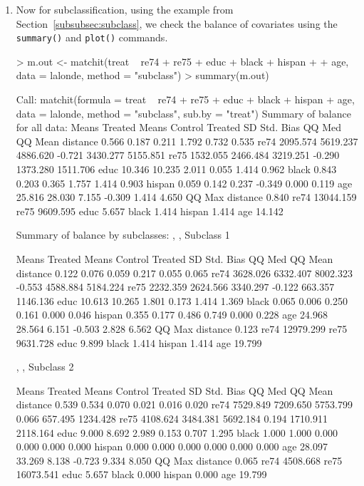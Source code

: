 \documentclass[oneside,letterpaper,titlepage]{article}
\begin{document}
\begin{enumerate}
\item Now for subclassification, using the example from
  Section~\ref{subsubsec:subclass}, we check the balance of covariates
  using the \texttt{summary()} and \texttt{plot()} commands.
\begin{Schunk}
\begin{Sinput}
> m.out <- matchit(treat ~ re74 + re75 + educ + black + hispan + 
+     age, data = lalonde, method = "subclass")
> summary(m.out)
\end{Sinput}
\begin{Soutput}
Call:
matchit(formula = treat ~ re74 + re75 + educ + black + hispan + 
    age, data = lalonde, method = "subclass", sub.by = "treat")
Summary of balance for all data:
         Means Treated Means Control Treated SD Std. Bias   QQ Med  QQ Mean
distance         0.566         0.187      0.211     1.792    0.732    0.535
re74          2095.574      5619.237   4886.620    -0.721 3430.277 5155.851
re75          1532.055      2466.484   3219.251    -0.290 1373.280 1511.706
educ            10.346        10.235      2.011     0.055    1.414    0.962
black            0.843         0.203      0.365     1.757    1.414    0.903
hispan           0.059         0.142      0.237    -0.349    0.000    0.119
age             25.816        28.030      7.155    -0.309    1.414    4.650
            QQ Max
distance     0.840
re74     13044.159
re75      9609.595
educ         5.657
black        1.414
hispan       1.414
age         14.142


Summary of balance by subclasses:
, , Subclass 1

         Means Treated Means Control Treated SD Std. Bias    QQ Med   QQ Mean
distance         0.122         0.076      0.059     0.217     0.055     0.065
re74          3628.026      6332.407   8002.323    -0.553  4588.884  5184.224
re75          2232.359      2624.566   3340.297    -0.122   663.357  1146.136
educ            10.613        10.265      1.801     0.173     1.414     1.369
black            0.065         0.006      0.250     0.161     0.000     0.046
hispan           0.355         0.177      0.486     0.749     0.000     0.228
age             24.968        28.564      6.151    -0.503     2.828     6.562
            QQ Max
distance     0.123
re74     12979.299
re75      9631.728
educ         9.899
black        1.414
hispan       1.414
age         19.799

, , Subclass 2

         Means Treated Means Control Treated SD Std. Bias    QQ Med   QQ Mean
distance         0.539         0.534      0.070     0.021     0.016     0.020
re74          7529.849      7209.650   5753.799     0.066   657.495  1234.428
re75          4108.624      3484.381   5692.184     0.194  1710.911  2118.164
educ             9.000         8.692      2.989     0.153     0.707     1.295
black            1.000         1.000      0.000     0.000     0.000     0.000
hispan           0.000         0.000      0.000     0.000     0.000     0.000
age             28.097        33.269      8.138    -0.723     9.334     8.050
            QQ Max
distance     0.065
re74      4508.668
re75     16073.541
educ         5.657
black        0.000
hispan       0.000
age         19.799


\end{Soutput}
\end{Schunk}
\end{enumerate}
\end{document}
